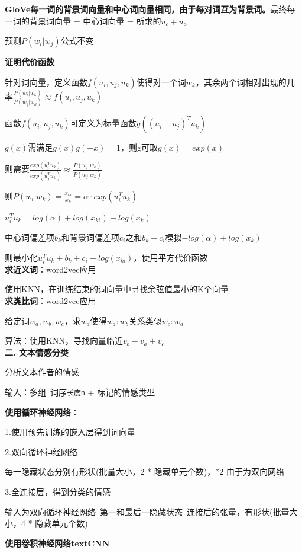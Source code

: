 \documentclass[UTF8]{ctexart}
\begin{document}
  \textbf{GloVe每一词的背景词向量和中心词向量相同，由于每对词互为背景词。}最终每一词的背景词向量 = 中心词向量 = 所求的$u_c + u_o$
  
  \quad 预测$P(w_i | w_j)$公式不变
  
  \textbf{证明代价函数}
  
  \quad 针对词向量，定义函数$f(u_i, u_j, u_k)$使得对一个词$w_k$，其余两个词相对出现的几率$\frac{P(w_i | w_k)}{P(w_j | w_k)} \approx f(u_i, u_j, u_k)$
  
  \quad \quad 函数$f(u_i, u_j, u_k)$可定义为标量函数$g((u_i - u_j)^Tu_k)$
  
  \quad \quad $g(x)$需满足$g(x)g(-x) = 1$，则g可取$g(x) = exp(x)$
  
  \quad 则需要$\frac{exp(u_i^Tu_k)}{exp(u_j^Tu_k)} \approx \frac{P(w_i | w_k)}{P(w_j | w_k)}$

  \quad 则$P(w_i | w_k) = \frac{x_{ki}}{x_k} = \alpha \cdot exp(u_i^Tu_k)$

  \quad \quad $u_i^Tu_k = log(\alpha) + log(x_{ki}) - log(x_k)$

  \quad 中心词偏差项$b_k$和背景词偏差项$c_i$之和$b_k + c_i$模拟$-log(\alpha) + log(x_k)$

  \quad 则最小化$u_i^Tu_k + b_k + c_i - log(x_{ki})$，使用平方代价函数\\
\textbf{求近义词}：word2vec应用

  使用KNN，在训练结束的词向量中寻找余弦值最小的K个向量\\
\textbf{求类比词}：word2vec应用

  给定词$w_a, w_b, w_c$，求$w_d$使得$w_a : w_b$关系类似$w_c:w_d$

  算法：使用KNN，寻找向量临近$v_b - v_a + v_c$\\
\textbf{二. 文本情感分类}

  分析文本作者的情感

  输入：多组\ 词序\texttt{长度n} + 标记的情感类型

  \textbf{使用循环神经网络}：

  \quad 1.使用预先训练的嵌入层得到词向量

  \quad 2.双向循环神经网络

  \quad \quad 每一隐藏状态分别有形状(批量大小，2 * 隐藏单元个数)，*2 由于为双向网络

  \quad 3.全连接层，得到分类的情感

  \quad \quad 输入为双向循环神经网络\ 第一和最后一隐藏状态\ 连接后的张量，有形状(批量大小，4 * 隐藏单元个数)

  \textbf{使用卷积神经网络textCNN}
\end{document}
